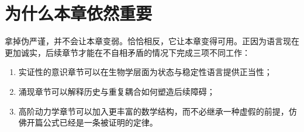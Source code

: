 \section{为什么本章依然重要}

拿掉伪严谨，并不会让本章变弱。恰恰相反，它让本章变得可用。正因为语言现在更加诚实，后续章节才能在不自相矛盾的情况下完成三项不同工作：
\begin{enumerate}[nosep]
  \item 实证性的意识章节可以在生物学层面为状态与稳定性语言提供正当性；
  \item 涌现章节可以解释历史与重复耦合如何塑造后续障碍；
  \item 高阶动力学章节可以加入更丰富的数学结构，而不必继承一种虚假的前提，仿佛开篇公式已经是一条被证明的定律。
\end{enumerate}